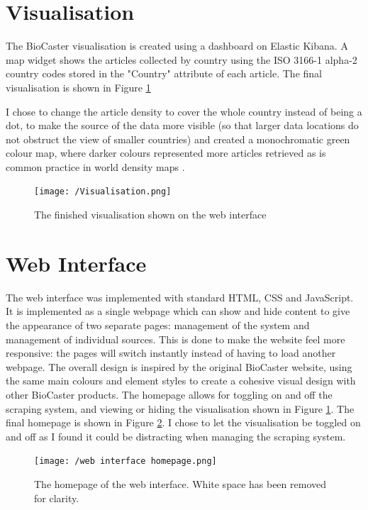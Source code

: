 \documentclass{l4proj}
\begin{document}
\section{Visualisation}
The BioCaster visualisation is created using a dashboard on Elastic Kibana. A map widget shows the articles collected by country using the ISO 3166-1 alpha-2 country codes stored in the "Country" attribute of each article. The final visualisation is shown in Figure \ref{fig:visualisation}

I chose to change the article density to cover the whole country instead of being a dot, to make the source of the data more visible (so that larger data locations do not obstruct the view of smaller countries) and created a monochromatic green colour map, where darker colours represented more articles retrieved as is common practice in world density maps \citep{ourworldindata_density, ons_density}.

\begin{figure}[h]
\texttt{[image: /Visualisation.png]}
\caption{The finished visualisation shown on the web interface}
\label{fig:visualisation}
\end{figure}


\section{Web Interface}
The web interface was implemented with standard HTML, CSS and JavaScript. It is implemented as a single webpage which can show and hide content to give the appearance of two separate pages: management of the system and management of individual sources. This is done to make the website feel more responsive: the pages will switch instantly instead of having to load another webpage. The overall design is inspired by the original BioCaster website, using the same main colours and element styles to create a cohesive visual design with other BioCaster products. The homepage allows for toggling on and off the scraping system, and viewing or hiding the visualisation shown in Figure \ref{fig:visualisation}. The final homepage is shown in Figure \ref{fig:web-interface-homepage}. I chose to let the visualisation be toggled on and off as I found it could be distracting when managing the scraping system.
\begin{figure}[h]
\centering
\texttt{[image: /web interface homepage.png]}
\caption{The homepage of the web interface. White space has been removed for clarity.}
\label{fig:web-interface-homepage}
\end{figure}
\end{document}
